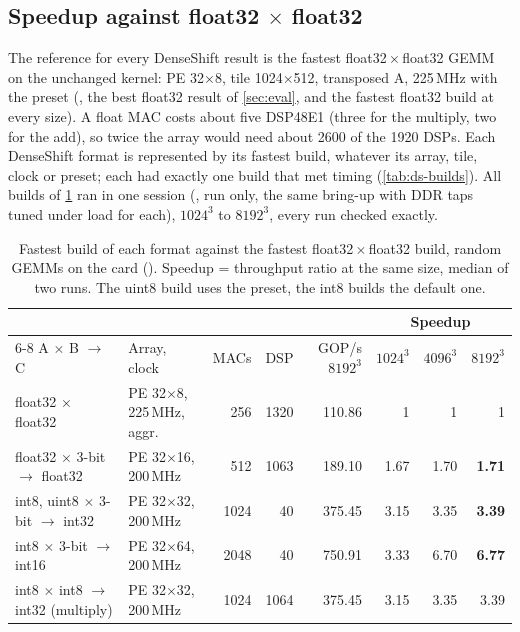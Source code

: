 \subsection{Speedup against float32 \texorpdfstring{\(\times\)}{x} float32}
\label{sec:ds:speedup}
The reference for every DenseShift result is the fastest float32\,\(\times\)\,float32 GEMM on the unchanged kernel:
PE 32\(\times\)8, tile 1024\(\times\)512, transposed A, 225\,MHz with the  preset
(, the best float32 result of \cref{sec:eval}, and the fastest float32 build at every size). A float
MAC costs about five DSP48E1 (three for the multiply, two for the add), so twice the array would need about 2600 of
the 1920 DSPs. Each DenseShift format is represented by its fastest build, whatever its array, tile, clock or preset;
each had exactly one build that met timing (\cref{tab:ds-builds}). All builds of \cref{tab:ds-speedup} ran in one
session (, run only, the same bring-up with DDR taps tuned under load for each),
\(1024^3\) to \(8192^3\), every run checked exactly.

\begin{table}[ht]
\centering\small\setlength{\tabcolsep}{4pt}
\caption{Fastest build of each format against the fastest float32\,\(\times\)\,float32 build, random GEMMs on the
  card (). Speedup = throughput ratio at the same size, median of two runs. The uint8
  build uses the  preset, the int8 builds the default one.}
\label{tab:ds-speedup}
\begin{tabular}{@{}llrrrrrr@{}}
\toprule
& & & & & \multicolumn{3}{c}{Speedup} \\
\cmidrule(lr){6-8}
A \(\times\) B \(\to\) C & Array, clock & MACs & DSP & GOP/s \(8192^3\) & \(1024^3\) & \(4096^3\) & \(8192^3\) \\
\midrule
float32 \(\times\) float32 & PE 32\(\times\)8, 225\,MHz, aggr. & 256 & 1320 & 110.86 & 1 & 1 & 1 \\
\midrule
float32 \(\times\) 3-bit \(\to\) float32 & PE 32\(\times\)16, 200\,MHz & 512 & 1063 & 189.10 & 1.67 & 1.70 & \textbf{1.71} \\
int8, uint8 \(\times\) 3-bit \(\to\) int32 & PE 32\(\times\)32, 200\,MHz & 1024 & 40 & 375.45 & 3.15 & 3.35 & \textbf{3.39} \\
int8 \(\times\) 3-bit \(\to\) int16 & PE 32\(\times\)64, 200\,MHz & 2048 & 40 & 750.91 & 3.33 & 6.70 & \textbf{6.77} \\
\midrule
int8 \(\times\) int8 \(\to\) int32 (multiply) & PE 32\(\times\)32, 200\,MHz & 1024 & 1064 & 375.45 & 3.15 & 3.35 & 3.39 \\
\bottomrule
\end{tabular}
\end{table}

